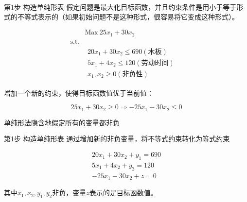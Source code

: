 \documentclass[UTF8]{ctexbeamer}
\begin{document}
\begin{frame}{第1步 构造单纯形表}
  假定问题是最大化目标函数，并且约束条件是用小于等于形式的不等式表示的（如果初始问题不是这种形式，很容易将它变成这种形式）。

  \[ 
  \begin{array}{lcl}
    & \mbox{Max}\ 25x_1 + 30x_2 & \\
    \mbox{s.t.} & &  \\
    &
    \begin{array}{c}
      20x_1 + 30x_2 \le 690 (\text{木板})\\
      5x_1 + 4x_2 \le 120 (\text{劳动时间})\\
      x_1, x_2 \ge 0 (\text{非负性})
    \end{array}
    &
  \end{array}
  \]

  增加一个新的约束，使得目标函数值优于当前值：

  \[
  25x_1 + 30x_2 \ge 0 \Longrightarrow -25x_1 - 30x_2 \le 0
  \]

  单纯形法隐含地假定所有的变量都非负

\end{frame}

\begin{frame}{第1步 构造单纯形表}
  通过增加新的非负变量，将不等式约束转化为等式约束

  \[
    \begin{array}{c}
      20x_1 + 30x_2 + y_1 = 690\\
      5x_1 + 4x_2 + y_2 =  120\\
      -25x_1 - 30x_2 + z = 0
    \end{array}
  \]

  其中$x_1, x_2, y_1, y_2$非负，变量$z$表示的是目标函数值。

\end{frame}
\end{document}
